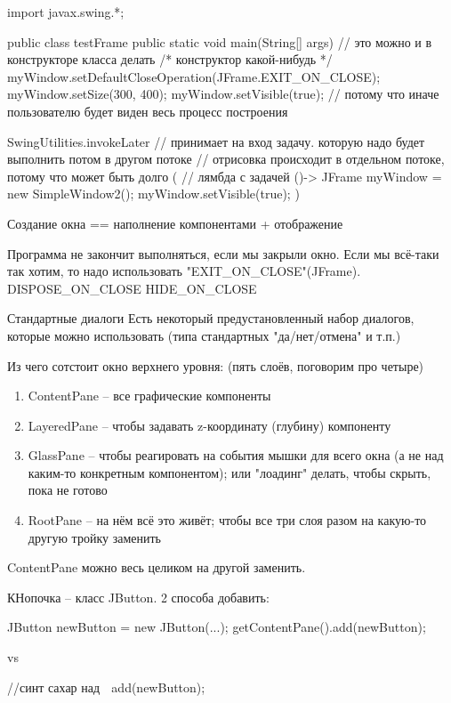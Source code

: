 \begin{javacode}
import javax.swing.*;

public class testFrame {
	public static void main(String[] args) {
		// это можно и в конструкторе класса делать
		/* конструктор какой-нибудь */
		myWindow.setDefaultCloseOperation(JFrame.EXIT_ON_CLOSE);
		myWindow.setSize(300, 400);
		myWindow.setVisible(true); // потому что иначе пользователю будет виден весь процесс построения
	}
}

SwingUtilities.invokeLater 
               // принимает на вход задачу. которую надо будет выполнить потом в другом потоке
			   // отрисовка происходит в отдельном потоке, потому что может быть долго
			(  // лямбда с задачей
		   ()-> {JFrame myWindow = new SimpleWindow2(); myWindow.setVisible(true);}
		)
\end{javacode}

Создание окна == наполнение компонентами + отображение

Программа не закончит выполняться, если мы закрыли окно.
Если мы всё-таки так хотим, то надо использовать \java"EXIT\_ON\_CLOSE"(JFrame).
DISPOSE\_ON\_CLOSE
HIDE\_ON\_CLOSE

Стандартные диалоги
Есть некоторый предустановленный набор диалогов, которые можно использовать (типа стандартных "да/нет/отмена" и т.п.)

Из чего сотстоит окно верхнего уровня: (пять слоёв, поговорим про четыре)
\begin{enumerate}
\item
	ContentPane -- все графические компоненты
\item 
	LayeredPane -- чтобы задавать z-координату (глубину) компоненту
\item
	GlassPane -- чтобы реагировать на события мышки для всего окна (а не над каким-то конкретным компонентом);
	или "лоадинг" делать, чтобы скрыть, пока не готово
\item
	RootPane -- на нём всё это живёт; чтобы все три слоя разом на какую-то другую тройку заменить
\end{enumerate}

ContentPane можно весь целиком на другой заменить.

КНопочка -- класс JButton. 2 способа добавить:
\begin{javacode}
JButton newButton = new JButton(...);
getContentPane().add(newButton);

vs

//синт сахар над ^^^
add(newButton);
\end{javacode}

